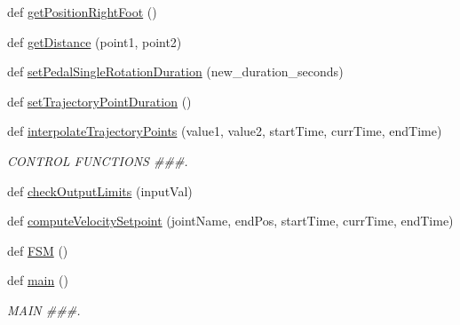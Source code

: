 \begin{DoxyCompactItemize}
def \mbox{\hyperlink{namespacepedal__simulation__interpolation__linear__trajectory__points_aa470979737ea0796da119aaeb2e46c94}{get\+Position\+Right\+Foot}} ()
\item 
def \mbox{\hyperlink{namespacepedal__simulation__interpolation__linear__trajectory__points_abcf37086aa984f3a2d352f009de5a362}{get\+Distance}} (point1, point2)
\item 
def \mbox{\hyperlink{namespacepedal__simulation__interpolation__linear__trajectory__points_aaad7b5ea9961b4497da52d7d649f1309}{set\+Pedal\+Single\+Rotation\+Duration}} (new\+\_\+duration\+\_\+seconds)
\item 
def \mbox{\hyperlink{namespacepedal__simulation__interpolation__linear__trajectory__points_a8ae6fa3671e9ca6e05825e390f12b8b6}{set\+Trajectory\+Point\+Duration}} ()
\item 
def \mbox{\hyperlink{namespacepedal__simulation__interpolation__linear__trajectory__points_a566b961b7c78e9a10e7bc0cca3e0c184}{interpolate\+Trajectory\+Points}} (value1, value2, start\+Time, curr\+Time, end\+Time)
\begin{DoxyCompactList}\small\item\em C\+O\+N\+T\+R\+OL F\+U\+N\+C\+T\+I\+O\+NS \#\#\#. \end{DoxyCompactList}\item 
def \mbox{\hyperlink{namespacepedal__simulation__interpolation__linear__trajectory__points_a66385fbebb1478a8f7666e94252cd986}{check\+Output\+Limits}} (input\+Val)
\item 
def \mbox{\hyperlink{namespacepedal__simulation__interpolation__linear__trajectory__points_acd7eb1865e5d89c44a0a4e799df6ff8f}{compute\+Velocity\+Setpoint}} (joint\+Name, end\+Pos, start\+Time, curr\+Time, end\+Time)
\item 
def \mbox{\hyperlink{namespacepedal__simulation__interpolation__linear__trajectory__points_aa9b9e1956f51882e5f93d5f2bc0fd29b}{F\+SM}} ()
\item 
def \mbox{\hyperlink{namespacepedal__simulation__interpolation__linear__trajectory__points_ab9a3bad7d020fd392cc08fdc73486141}{main}} ()
\begin{DoxyCompactList}\small\item\em M\+A\+IN \#\#\#. \end{DoxyCompactList}\end{DoxyCompactItemize}
